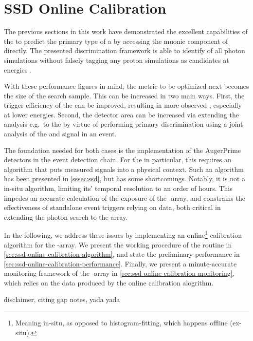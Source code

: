 
\chapter{SSD Online Calibration}
\label{chap:further-improvements}

The previous sections in this work have demonstrated the excellent capabilities
of the \UMD to predict the primary type of a \CR by accessing the muonic 
component of \EASs directly. The presented discrimination framework is able to 
identify  of all photon simulations without falsely tagging any 
proton simulations as candidates at energies . 

With these performance figures in mind, the metric to be optimized next becomes 
the size of the search sample. This can be increased in two main ways. First, 
the trigger efficiency of the \SD can be improved, resulting in more observed 
\EASs, especially at lower energies. Second, the detector area can be increased
via extending the analysis e.g.~to the  by virtue of performing primary 
discrimination using a joint analysis of the \WCD and \SSD signal in an event.

The foundation needed for both cases is the implementation of the AugerPrime 
detectors in the event detection chain. For the \SSD in particular, this
requires an algorithm that puts measured signals into a physical context. Such
an algorithm has been presented in \cref{sssec:ssd}, but has some shortcomings.
Notably, it is not a in-situ algorithm, limiting its' temporal resolution to an
order of hours. This impedes an accurate calculation of the exposure of the 
\SSD-array, and constrains the effectiveness of standalone event triggers 
relying on \SSD data, both critical in extending the photon search to the 
 array.

In the following, we address these issues by implementing an 
online\footnote{Meaning in-situ, as opposed to histogram-fitting, which happens
offline (ex-situ).} calibration algorithm for the \SSD-array. We present the 
working procedure of the routine in \cref{sec:ssd-online-calibration-algorithm},
and state the preliminary performance in 
\cref{sec:ssd-online-calibration-performance}. Finally, we present a 
minute-accurate monitoring framework of the \SSD-array in 
\cref{sec:ssd-online-calibration-monitoring}, which relies on the data produced
by the online calibration alogrithm.

disclaimer, citing gap notes, yada yada

